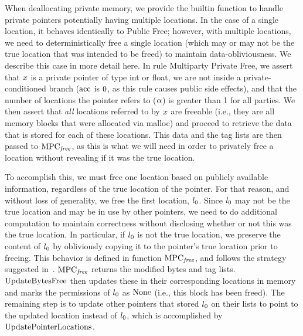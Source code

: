 When deallocating private memory, we provide the  builtin function to handle private pointers potentially having multiple locations. 
In the case of a single location, it behaves identically to Public Free; however, with multiple locations, we need to deterministically free a single location (which may or may not be the true location that was intended to be freed) to maintain data-obliviousness. We describe this case in more detail here.   
In rule Multiparty Private Free, we assert that $x$ is a private pointer of type int or float, we are not inside a private-conditioned branch ($\mathrm{acc}$ is $0$, as this rule causes public side effects), and that the number of locations the pointer refers to ($\alpha$) is greater than 1 for all parties. 
We then assert that \emph{all} locations referred to by $x$ are freeable (i.e., they are all memory blocks that were allocated via malloc) and proceed to retrieve the data that is stored for each of these locations.
This data and the tag lists are then passed to $\mathrm{MPC}_\mathit{{free}}$, as this is what we will need in order to privately free a location without revealing if it was the true location. 

To accomplish this, we must free one location based on publicly available information, regardless of the true location of the pointer. For that reason, and without loss of generality, we free the first location, $l_0$. 
Since $l_0$ may not be the true location and may be in use by other pointers, we need to do additional computation to maintain correctness without disclosing whether or not this was the true location. 
In particular, if $l_0$ is not the true location, we preserve the content of $l_0$ by obliviously copying it to the pointer's true location prior to freeing. 
This behavior is defined in function $\mathrm{MPC}_\mathit{{free}}$, and follows the strategy suggested in~\cite{Zhang18}.
$\mathrm{MPC}_\mathit{{free}}$ returns the modified bytes and tag lists. $\mathrm{UpdateBytesFree}$ then updates these in their corresponding locations in memory and marks the permissions of $l_0$ as $\mathrm{None}$ (i.e., this block has been freed). 
The remaining step is to update other pointers that stored $l_0$ on their lists to point to the updated location instead of $l_0$, which is accomplished by $\mathrm{UpdatePointerLocations}$. 



%
%

